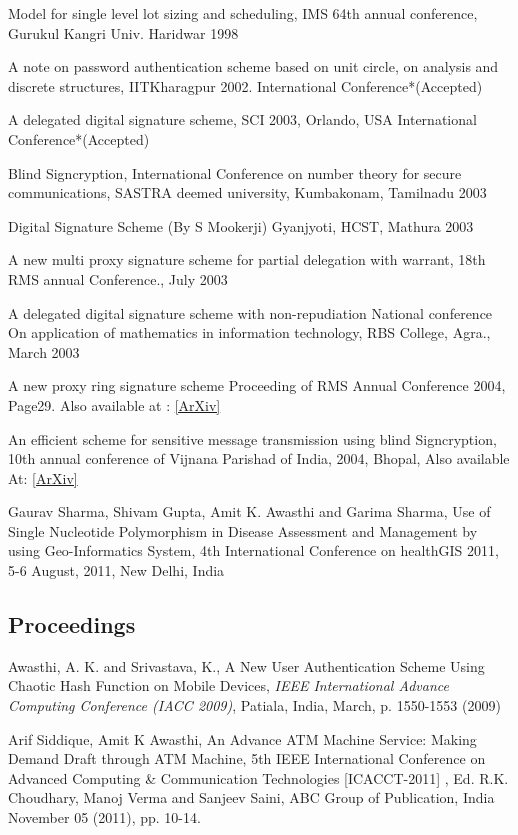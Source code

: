 \documentclass[letterpaper]{article}
\renewenvironment{itemize}{
  \begin{list}{}{
    \setlength{\leftmargin}{1.5em}
  }
}{
  \end{list}
}
\begin{document}
\begin{itemize}

\item Model for single level lot sizing and scheduling, IMS 64th annual conference, 
               Gurukul Kangri Univ. Haridwar 1998 
\item A note on password  authentication scheme based on unit circle, on analysis and    
             discrete structures, IITKharagpur 2002. International Conference*(Accepted) 
\item A delegated digital signature scheme, SCI 2003, Orlando, USA International    
       Conference*(Accepted)
\item Blind Signcryption, International Conference on number theory for secure 
               communications, SASTRA deemed university, Kumbakonam, Tamilnadu 2003 
\item Digital Signature Scheme (By S Mookerji) Gyanjyoti, HCST, Mathura 2003 
\item A new multi proxy signature scheme for partial delegation with warrant,  18th 
               RMS annual Conference., July 2003 
\item A delegated digital signature scheme with non-repudiation National conference 
               On application of mathematics in information technology, RBS College, Agra., 
               March 2003 
\item A new proxy ring signature scheme Proceeding of RMS Annual Conference 2004, 
               Page29. Also available at : 
							\href{http://arxiv.org/abs/cs.CR/0410010}{[ArXiv]}
\item An efficient scheme for sensitive message transmission using blind Signcryption, 
             10th annual conference of Vijnana Parishad of India, 2004, Bhopal, Also available 
              At: 
							\href{http://arxiv.org/abs/cs.CR/0504095}{[ArXiv]}
	\item  Gaurav Sharma, Shivam Gupta, Amit K. Awasthi and Garima Sharma, Use of Single Nucleotide Polymorphism in Disease Assessment and Management by using Geo-Informatics System, 4th International Conference on healthGIS 2011, 5-6 August, 2011, New Delhi, India
\end{itemize}

\subsection*{Proceedings}
\begin{itemize}
\item Awasthi, A. K. and Srivastava, K., A New User Authentication Scheme Using 
              Chaotic Hash Function on Mobile Devices, \emph{IEEE International Advance Computing 
               Conference (IACC 2009)}, Patiala, India, March, p. 1550-1553 (2009)
\item 	Arif Siddique, Amit K Awasthi, An Advance ATM Machine Service: Making Demand Draft through ATM Machine, 5th IEEE International Conference on Advanced Computing \& Communication Technologies [ICACCT-2011] , Ed. R.K. Choudhary, Manoj Verma and Sanjeev Saini, ABC Group of Publication, India November 05 (2011), pp. 10-14.
\end{itemize}
\end{document}

